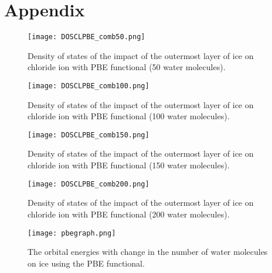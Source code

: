 \documentclass[a4paper,11pt]{report}
\begin{document}
\section{Appendix}
\begin{figure}[H]\large
\texttt{[image: DOSCLPBE\_comb50.png]}
\caption{Density of states of the impact of the outermost layer of ice on chloride ion with PBE functional (50 water molecules).}
\label{figure1b}
\end{figure}

\begin{figure}[H]\large
\texttt{[image: DOSCLPBE\_comb100.png]}
\caption{Density of states of the impact of the outermost layer of ice on chloride ion with PBE functional (100 water molecules).}
\label{figure2b}
\end{figure}

\begin{figure}[H]\large
\texttt{[image: DOSCLPBE\_comb150.png]}
\caption{Density of states of the impact of the outermost layer of ice on chloride ion with PBE functional (150 water molecules).}
\label{figure3b}
\end{figure}

\begin{figure}[H]\large
\texttt{[image: DOSCLPBE\_comb200.png]}
\caption{Density of states of the impact of the outermost layer of ice on chloride ion with PBE functional (200 water molecules).}
\label{figure4b}
\end{figure}

\begin{figure}[H]\large
\texttt{[image: pbegraph.png]}
\caption{The orbital energies with change in the number of water molecules on ice using the PBE functional.}
\label{figure5}
\end{figure}










\end{document}
